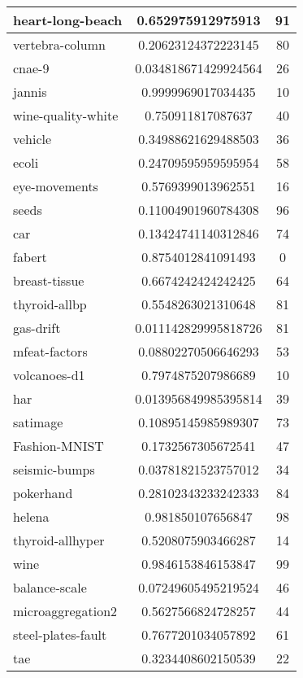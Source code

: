 \documentclass[times,specification,annotation]{itmo-student-thesis}
\begin{document}
\begin{center}
\begin{longtable}{ |m{5cm}|c|c| }
			\hline
			heart-long-beach & 0.652975912975913 & 91 \\
			\hline
			vertebra-column & 0.20623124372223145 & 80 \\
			\hline
			cnae-9 & 0.034818671429924564 & 26 \\
			\hline
			jannis & 0.9999969017034435 & 10 \\
			\hline
			wine-quality-white & 0.750911817087637 & 40 \\
			\hline
			vehicle & 0.34988621629488503 & 36 \\
			\hline
			ecoli & 0.24709595959595954 & 58 \\
			\hline
			eye-movements & 0.5769399013962551 & 16 \\
			\hline
			seeds & 0.11004901960784308 & 96 \\
			\hline
			car & 0.13424741140312846 & 74 \\
			\hline
			fabert & 0.8754012841091493 & 0 \\
			\hline
			breast-tissue & 0.6674242424242425 & 64 \\
			\hline
			thyroid-allbp & 0.5548263021310648 & 81 \\
			\hline
			gas-drift & 0.011142829995818726 & 81 \\
			\hline
			mfeat-factors & 0.08802270506646293 & 53 \\
			\hline
			volcanoes-d1 & 0.7974875207986689 & 10 \\
			\hline
			har & 0.013956849985395814 & 39 \\
			\hline
			satimage & 0.10895145985989307 & 73 \\
			\hline
			Fashion-MNIST & 0.1732567305672541 & 47 \\
			\hline
			seismic-bumps & 0.03781821523757012 & 34 \\
			\hline
			pokerhand & 0.28102343233242333 & 84 \\
			\hline
			helena & 0.981850107656847 & 98 \\
			\hline
			thyroid-allhyper & 0.5208075903466287 & 14 \\
			\hline
			wine & 0.9846153846153847 & 99 \\
			\hline
			balance-scale & 0.07249605495219524 & 46 \\
			\hline
			microaggregation2 & 0.5627566824728257 & 44 \\
			\hline
			steel-plates-fault & 0.7677201034057892 & 61 \\
			\hline
			tae & 0.3234408602150539 & 22 \\

\end{longtable}
\end{center}
\end{document}
